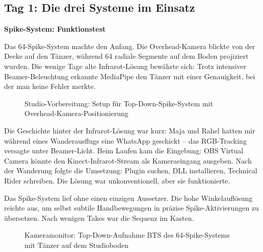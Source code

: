 \clearpage
\subsection{Tag 1: Die drei Systeme im Einsatz}

\textbf{Spike-System: Funktionstest}

\raggedright Das 64-Spike-System machte den Anfang. Die Overhead-Kamera blickte von der Decke auf den Tänzer, während 64 radiale Segmente auf dem Boden projiziert wurden. Die wenige Tage alte Infrarot-Lösung bewährte sich: Trotz intensiver Beamer-Beleuchtung erkannte MediaPipe den Tänzer mit einer Genauigkeit, bei der man keine Fehler merkte.

\begin{figure}[htbp]
    \centering
    \caption{Studio-Vorbereitung: Setup für Top-Down-Spike-System mit Overhead-Kamera-Positionierung}
    \label{fig:topdown_setup}
\end{figure}


Die Geschichte hinter der Infrarot-Lösung war kurz: Maja und Rahel hatten mir während eines Wanderausflugs eine WhatsApp geschickt – das RGB-Tracking versagte unter Beamer-Licht. Beim Laufen kam die Eingebung: OBS Virtual Camera könnte den Kinect-Infrarot-Stream als Kameraeingang ausgeben. Nach der Wanderung folgte die Umsetzung: Plugin suchen, DLL installieren, Technical Rider schreiben. Die Lösung war unkonventionell, aber sie funktionierte.



Das Spike-System lief ohne einen einzigen Aussetzer. Die hohe Winkelauflösung reichte aus, um selbst subtile Handbewegungen in präzise Spike-Aktivierungen zu übersetzen. Nach wenigen Takes war die Sequenz im Kasten.

\begin{figure}[htbp]
    \centering
    \caption{Kameramonitor: Top-Down-Aufnahme BTS des 64-Spike-Systems mit Tänzer auf dem Studioboden}
    \label{fig:camera_monitor}
\end{figure}

